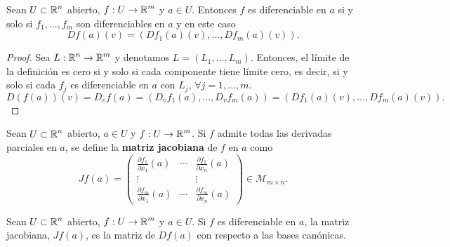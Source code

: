 \begin{prop}
Sean $\displaystyle U \subset \mathbb{R}^{n} $ abierto, $\displaystyle f : U \to \mathbb{R}^{m} $ y $\displaystyle a \in U $. Entonces $\displaystyle f $ es diferenciable en $\displaystyle a $ si y solo si $\displaystyle f_{1}, \ldots, f_{m} $ son diferenciables en $\displaystyle a $ y en este caso 
\[Df\left(a\right)\left(v\right) = \left(Df_{1}\left(a\right)\left(v\right), \ldots, Df_{m}\left(a\right)\left(v\right)\right) .\]
\end{prop}
\begin{proof}
Sea $\displaystyle L : \mathbb{R}^{n} \to \mathbb{R}^{m} $ y denotamos $\displaystyle L = \left(L_{1}, \ldots, L_{m}\right) $. Entonces, el límite de la definición es cero si y solo si cada componente tiene límite cero, es decir, si y solo si cada $\displaystyle f_{j} $ es diferenciable en $\displaystyle a $ con $\displaystyle L_{j} $, $\displaystyle \forall j = 1, \ldots, m $. 
\[  D\left(f\left(a\right)\right)\left(v\right) = D_{v}f\left(a\right) = \left(D_{v}f_{1}\left(a\right), \ldots, D_{v}f_{m}\left(a\right)\right) = \left(Df_{1}\left(a\right)\left(v\right), \ldots, Df_{m}\left(a\right)\left(v\right)\right).\]
\end{proof}
\begin{definition}
Sean $\displaystyle U \subset \mathbb{R}^{n} $ abierto, $\displaystyle a \in U $ y $\displaystyle f : U \to \mathbb{R}^{m} $. Si $\displaystyle f $ admite todas las derivadas parciales en $\displaystyle a $, se define la \textbf{matriz jacobiana} de $\displaystyle f $ en $\displaystyle a $ como 
\[Jf\left(a\right) = \begin{pmatrix} \frac{\partial f_{1}}{\partial x_{1}}\left(a\right) & \cdots & \frac{\partial f_{1}}{\partial x_{n}} \left(a\right)\\ \vdots & & \vdots \\ \frac{\partial f_{m}}{\partial x_{1}}\left(a\right) & \cdots & \frac{\partial f_{m}}{\partial x_{n}}\left(a\right) \end{pmatrix} \in \mathcal{M}_{m \times n} .\]
\end{definition}
\begin{prop}
Sean $\displaystyle U \subset \mathbb{R}^{n} $ abierto, $\displaystyle f : U \to \mathbb{R}^{m} $ y $\displaystyle a \in U $. Si $\displaystyle f $ es diferenciable en $\displaystyle a $, la matriz jacobiana, $\displaystyle Jf\left(a\right) $, es la matriz de $\displaystyle Df\left(a\right) $ con respecto a las bases canónicas.
\end{prop}
